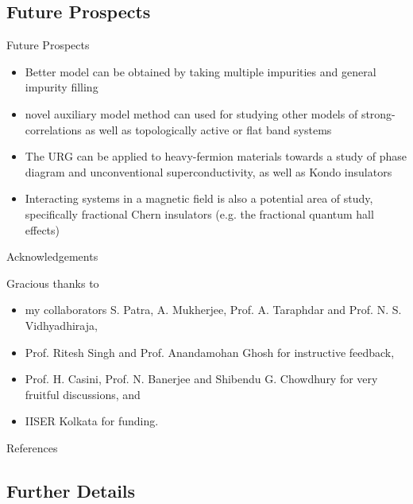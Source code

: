 \documentclass[8pt,aspectratio=169]{beamer}
\newcommand{\nitem}{\item[\ding{51}]}
\begin{document}
\begin{frame}{}
\section{Future Prospects}
\end{frame}

\begin{frame}{Future Prospects}
\begin{itemize}
	\nitem Better model can be obtained by taking multiple impurities and general impurity filling\\[20pt]
\nitem novel auxiliary model method can used for studying other models of strong-correlations as well as topologically active or flat band systems\\[20pt]
\nitem The URG can be applied to heavy-fermion materials towards a study of phase diagram and unconventional superconductivity, as well as Kondo insulators\\[20pt]
\nitem Interacting systems in a magnetic field is also a potential area of study, specifically fractional Chern insulators (e.g. the fractional quantum hall effects)
\end{itemize}
\end{frame}


\begin{frame}{Acknowledgements}

\flushleft
Gracious thanks to\\[10pt]
\begin{itemize}
	\nitem my collaborators \alert{S. Patra, A. Mukherjee, Prof. A. Taraphdar} and \alert{Prof. N. S. Vidhyadhiraja},\\[10pt]
	\nitem \alert{Prof. Ritesh Singh} and \alert{Prof. Anandamohan Ghosh} for instructive feedback,\\[10pt]
	\nitem \alert{Prof. H. Casini, Prof. N. Banerjee} and \alert{Shibendu G. Chowdhury} for very fruitful discussions, and\\[10pt]
	\nitem IISER Kolkata for funding.
\end{itemize}

\end{frame}

\appendix

\begin{frame}[allowframebreaks]{References}
\printbibliography[heading=none]
\end{frame}

\begin{frame}{}
\section{Further Details}
\end{frame}
\end{document}
